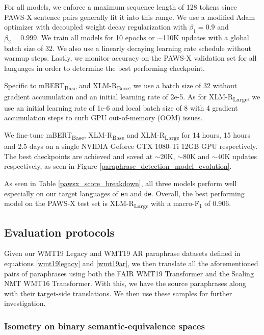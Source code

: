 \documentclass[11pt,a4paper]{article}
\begin{document}
For all models, we enforce a maximum sequence length of 128 tokens since PAWS-X sentence pairs generally fit it into this range. We use a modified Adam optimizer with decoupled weight decay regularization \cite{DBLP:journals/corr/abs-1711-05101} with $\beta_1 = 0.9$ and $\beta_2=0.999$. We train all models for 10 epochs or $\sim$110K updates with a global batch size of 32. We also use a linearly decaying learning rate schedule without warmup steps. Lastly, we monitor accuracy on the PAWS-X validation set for all languages in order to determine the best performing checkpoint.

Specific to mBERT\textsubscript{Base} and XLM-R\textsubscript{Base}, we use a batch size of 32 without gradient accumulation and an initial learning rate of 2e-5. As for XLM-R\textsubscript{Large}, we use an initial learning rate of 1e-6 and local batch size of 8 with 4 gradient accumulation steps to curb GPU out-of-memory (OOM) issues.

We fine-tune mBERT\textsubscript{Base}, XLM-R\textsubscript{Base} and XLM-R\textsubscript{Large} for 14 hours, 15 hours and 2.5 days on a single NVIDIA Geforce GTX 1080-Ti 12GB GPU respectively. The best checkpoints are achieved and saved at $\sim$20K, $\sim$80K and $\sim$40K updates respectively, as seen in Figure \ref{paraphrase_detection_model_evolution}.

As seen in Table \ref{pawsx_score_breakdown}, all three models perform well especially on our target languages of \texttt{en} and \texttt{de}. Overall, the best performing model on the PAWS-X test set is XLM-R\textsubscript{Large} with a macro-F\textsubscript{1} of 0.906.


\subsection{Evaluation protocols}

Given our WMT19 Legacy and WMT19 AR paraphrase datasets defined in equations \ref{wmt19legacy} and \ref{wmt19ar}, we then translate all the aforementioned pairs of paraphrases using both the FAIR WMT19 Transformer and the Scaling NMT WMT16 Transformer. With this, we have the source paraphrases along with their target-side translations. We then use these samples for further investigation. 

\subsubsection{Isometry on binary semantic-equivalence spaces}
\end{document}
